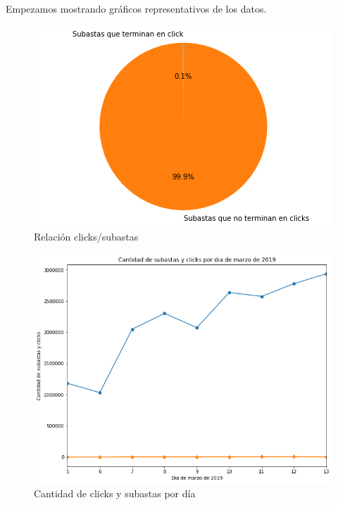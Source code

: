 \documentclass[a4paper, 12pt]{article}
\newcommand\tab[1][1cm]{\hspace*{#1}}
\begin{document}
	\tab Empezamos mostrando gráficos representativos de los datos.
	\FloatBarrier
		\begin{figure}[h]
			\centering
			\includegraphics[width=350pt]{images/auctions-clicks/subastasterminadasenclicks.png}
			\caption{Relación clicks/subastas}
			\label{subastasterminadasenclicks}
		\end{figure}

		\begin{figure}[h]
			\centering
			\includegraphics[width=350pt]{images/auctions-clicks/subyclickspordia.png}
			\caption{Cantidad de clicks y subastas por día}
			\label{clicksysubastaspordia}
		\end{figure}
\end{document}
